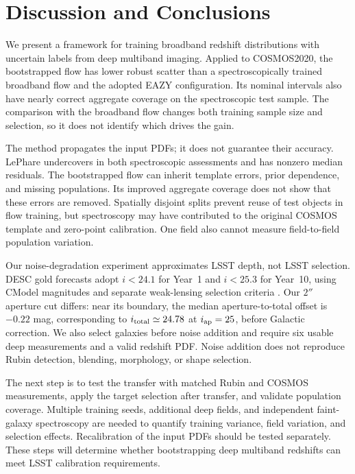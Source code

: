 \section{Discussion and Conclusions}\label{sec:discussion}
We present a framework for training broadband redshift distributions with
uncertain labels from deep multiband imaging. Applied to COSMOS2020, the
bootstrapped flow has lower robust scatter than a spectroscopically trained
broadband flow and the adopted EAZY configuration. Its nominal intervals
also have nearly correct aggregate coverage on the spectroscopic test
sample. The comparison with the broadband flow changes both training
sample size and selection, so it does not identify which drives the gain.

The method propagates the input PDFs; it does not guarantee their accuracy.
LePhare undercovers in both spectroscopic assessments and has nonzero median
residuals. The bootstrapped flow can inherit template errors, prior dependence,
and missing populations. Its improved aggregate coverage does not show that
these errors are removed. Spatially disjoint splits prevent reuse of test
objects in flow training, but spectroscopy may have contributed to the
original COSMOS template and zero-point calibration. One field also cannot
measure field-to-field population variation.

Our noise-degradation experiment approximates LSST depth, not LSST selection.
DESC gold forecasts adopt $i<24.1$ for Year~1 and $i<25.3$ for Year~10,
using CModel magnitudes and separate weak-lensing selection criteria
\citep{desc2018}. Our $2''$ aperture cut differs: near its boundary, the
median aperture-to-total offset is $-0.22$ mag, corresponding to
$i_{\rm total}\simeq24.78$ at $i_{\rm ap}=25$, before Galactic correction.
We also select galaxies before noise addition and require six usable deep
measurements and a valid redshift PDF. Noise addition does not reproduce
Rubin detection, blending, morphology, or shape selection.

The next step is to test the transfer with matched Rubin and COSMOS
measurements, apply the target selection after transfer, and validate
population coverage. Multiple training seeds, additional deep fields,
and independent faint-galaxy spectroscopy are needed to quantify training
variance, field variation, and selection effects. Recalibration of the
input PDFs should be tested separately. These steps will determine whether
bootstrapping deep multiband redshifts can meet LSST calibration requirements.
